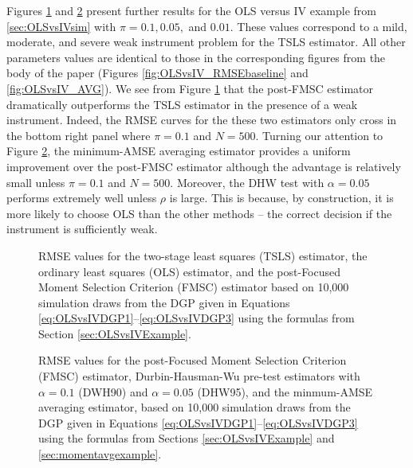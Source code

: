 Figures \ref{fig:OLSvsIV_RMSEbaseline_weak} and \ref{fig:OLSvsIV_AVG_weak} present further results for the OLS versus IV example from \ref{sec:OLSvsIVsim} with $\pi = 0.1, 0.05,$ and $0.01$.
These values correspond to a mild, moderate, and severe weak instrument problem for the TSLS estimator.
All other parameters values are identical to those in the corresponding figures from the body of the paper (Figures \ref{fig:OLSvsIV_RMSEbaseline} and \ref{fig:OLSvsIV_AVG}).
We see from Figure \ref{fig:OLSvsIV_RMSEbaseline_weak} that the post-FMSC estimator dramatically outperforms the TSLS estimator in the presence of a weak instrument.
Indeed, the RMSE curves for the these two estimators only cross in the bottom right panel where $\pi = 0.1$ and $N = 500$. 
Turning our attention to Figure \ref{fig:OLSvsIV_AVG_weak}, the minimum-AMSE averaging estimator provides a uniform improvement over the post-FMSC estimator although the advantage is relatively small unless $\pi = 0.1$ and $N=500$. 
Moreover, the DHW test with $\alpha = 0.05$ performs extremely well unless $\rho$ is large.
This is because, by construction, it is more likely to choose OLS than the other methods -- the correct decision if the instrument is sufficiently weak.


\begin{figure}[h]
\centering
	
	\caption{RMSE values for the two-stage least squares (TSLS) estimator, the ordinary least squares (OLS) estimator, and the post-Focused Moment Selection Criterion (FMSC) estimator based on 10,000 simulation draws from the DGP given in Equations \ref{eq:OLSvsIVDGP1}--\ref{eq:OLSvsIVDGP3} using the formulas from Section \ref{sec:OLSvsIVExample}.}
	\label{fig:OLSvsIV_RMSEbaseline_weak}
\end{figure}

\begin{figure}[h]
\centering
	
	\caption{RMSE values for the post-Focused Moment Selection Criterion (FMSC) estimator, Durbin-Hausman-Wu pre-test estimators with $\alpha = 0.1$ (DWH90) and $\alpha = 0.05$ (DHW95), and the minmum-AMSE averaging estimator, based on 10,000 simulation draws from the DGP given in Equations \ref{eq:OLSvsIVDGP1}--\ref{eq:OLSvsIVDGP3} using the formulas from Sections \ref{sec:OLSvsIVExample} and \ref{sec:momentavgexample}.}
	\label{fig:OLSvsIV_AVG_weak}
\end{figure}


